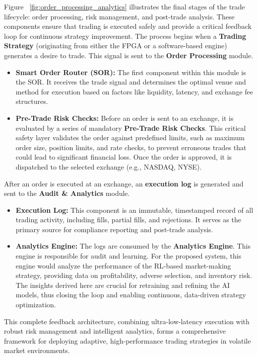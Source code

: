 Figure ~\ref{fig:order_processing_analytics} illustrates the final stages of the trade lifecycle: order processing, risk management, and post-trade analysis. These components ensure that trading is executed safely and provide a critical feedback loop for continuous strategy improvement. The process begins when a \textbf{Trading Strategy} (originating from either the FPGA or a software-based engine) generates a desire to trade. This signal is sent to the \textbf{Order Processing} module. \begin{itemize} 
    \item \textbf{Smart Order Router (SOR):} The first component within this module is the SOR. It receives the trade signal and determines the optimal venue and method for execution based on factors like liquidity, latency, and exchange fee structures. 
    \item \textbf{Pre-Trade Risk Checks:} Before an order is sent to an exchange, it is evaluated by a series of mandatory \textbf{Pre-Trade Risk Checks}. This critical safety layer validates the order against predefined limits, such as maximum order size, position limits, and rate checks, to prevent erroneous trades that could lead to significant financial loss. Once the order is approved, it is dispatched to the selected exchange (e.g., NASDAQ, NYSE). 
\end{itemize} After an order is executed at an exchange, an \textbf{execution log} is generated and sent to the \textbf{Audit \& Analytics} module. \begin{itemize} 
    \item \textbf{Execution Log:} This component is an immutable, timestamped record of all trading activity, including fills, partial fills, and rejections. It serves as the primary source for compliance reporting and post-trade analysis. 
    \item \textbf{Analytics Engine:} The logs are consumed by the \textbf{Analytics Engine}. This engine is responsible for audit and learning. For the proposed system, this engine would analyze the performance of the RL-based market-making strategy, providing data on profitability, adverse selection, and inventory risk. The insights derived here are crucial for retraining and refining the AI models, thus closing the loop and enabling continuous, data-driven strategy optimization. 
\end{itemize} This complete feedback architecture, combining ultra-low-latency execution with robust risk management and intelligent analytics, forms a comprehensive framework for deploying adaptive, high-performance trading strategies in volatile market environments.

